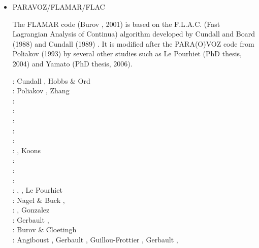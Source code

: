 \begin{itemize}
\item PARAVOZ/FLAMAR/FLAC 

The FLAMAR code (Burov \etal, 2001) is based on the
F.L.A.C. (Fast Lagrangian Analysis of Continua) algorithm developed by Cundall and Board (1988) 
and Cundall (1989) \cite{cund89}. It is modified after the PARA(O)VOZ code from 
Poliakov \etal (1993) \cite{pocp93} by several
other studies such as Le Pourhiet (PhD thesis, 2004) and Yamato (PhD thesis, 2006).

\begin{scriptsize}
\nineteeneightynine: Cundall \cite{cund89}, Hobbs \& Ord \cite{hoor89}\\
\nineteenninetythree: Poliakov \etal \cite{pocp93}, Zhang \etal \cite{zhhj93}\\
\nineteenninetyfour: \cite{wizh94}\\
\nineteenninetysix: \cite{zhho96}\\
\nineteenninetyeight: \cite{gepd98}\\
\twothousand: \cite{labp00}\\
\twothousandone: \cite{bujl01}\cite{bupo01}\\
\twothousandtwo: \cite{bast02}\cite{clbb02}, Koons \etal \cite{kozc02}\\
\twothousandthree: \cite{hags03}\cite{gehd03}\cite{upke03}\\
\twothousandfour: \cite{guhl04}\cite{gewi04}\cite{toba04}\cite{tibb04}\cite{clbm04}\cite{tobj04}\\
\twothousandfive: \cite{bugu05}\\
\twothousandsix: \cite{buwa06}, \cite{lemm06}, Le Pourhiet \etal \cite{legs06}\\
\twothousandseven: Nagel \& Buck \cite{nabu07}, \cite{yaab07}\cite{buto07}\cite{chem07}\\
\twothousandeight: \cite{yaba08}\cite{tibb08}\cite{buya08}, Gonzalez \etal \cite{gogm08}\\
\twothousandnine: Gerbault \etal \cite{gecm09}, \cite{yahb09}\cite{bucl09}\cite{tigv09}\cite{yamb09}\\
\twothousandten: Burov \& Cloetingh \cite{bucl10}\\
\twothousandtwelve: Angiboust \etal \cite{anwb12}, Gerbault \etal \cite{gech12}, 
                    Guillou-Frottier \etal \cite{gubc12}, Gerbault \cite{gerb12}, 

\end{scriptsize}
\end{itemize}
